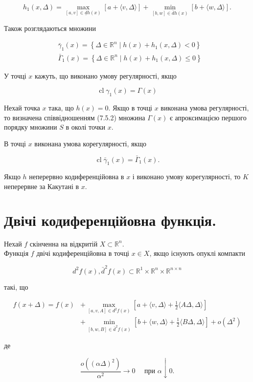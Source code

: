 \documentclass[12pt,a4paper]{extarticle}
\numberwithin{section}{part}
\begin{document}
$$
h_{1}(x, \Delta)=\max _{[a, v] \in \underline{d} h(x)}[a+\langle v, \Delta\rangle]+\min _{[b, w] \in \bar{d} h(x)}[b+\langle w, \Delta\rangle] .
$$

Також розглядаються множини

$$
\begin{aligned}
& \bar{\gamma}_{1}(x)=\left\{\Delta \in \mathbb{R}^{n} \mid h(x)+h_{1}(x, \Delta)<0\right\} \\
& \bar{\Gamma}_{1}(x)=\left\{\Delta \in \mathbb{R}^{n} \mid h(x)+h_{1}(x, \Delta) \leq 0\right\}
\end{aligned}
$$

У точці $x$ кажуть, що виконано умову регулярності, якщо

$$
\operatorname{cl} \gamma_{1}(x)=\Gamma(x)
$$

Нехай точка $x$ така, що $h(x)=0$. Якщо в точці $x$ виконана умова регулярності, то визначена співвідношенням (7.5.2) множина $\Gamma(x)$ є апроксимацією першого порядку множини $S$ в околі точки $x$.

В точці $x$ виконана умова корегулярності, якщо

$$
\operatorname{cl} \bar{\gamma}_{1}(x)=\bar{\Gamma}_{1}(x) .
$$

Якщо $h$ неперервно кодиференційовна в $x$ і виконано умову корегулярності, то $K$ неперервне за Какутані в $x$.

\section{Двічі кодиференційовна функція.}
Нехай $f$ скінченна на відкритій $X \subset \mathbb{R}^{n}$.\\
Функція $f$ двічі кодиференційовна в точці $x \in X$, якщо існують опуклі компакти

$$
d^{2} f(x), \bar{d}^{2} f(x) \subset \mathbb{R}^{1} \times \mathbb{R}^{n} \times \mathbb{R}^{n \times n}
$$

такі, що

$$
\begin{aligned}
f(x+\Delta)=f(x) & +\max _{[a, v, A] \in d^{2} f(x)}\left[a+\langle v, \Delta\rangle+\frac{1}{2}\langle A \Delta, \Delta\rangle\right] \\
& +\min _{[b, w, B] \in \bar{d}^{2} f(x)}\left[b+\langle w, \Delta\rangle+\frac{1}{2}\langle B \Delta, \Delta\rangle\right]+o\left(\Delta^{2}\right)
\end{aligned}
$$

де

$$
\frac{o\left((\alpha \Delta)^{2}\right)}{\alpha^{2}} \rightarrow 0 \quad \text { при } \alpha \downarrow 0 .
$$
\end{document}
